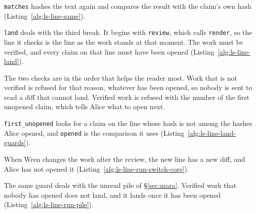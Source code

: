 
\texttt{matches} hashes the text again and compares the result with the
claim's own hash (Listing~\ref{alg:ls-line-same}).


\texttt{land} deals with the third break. It begins with \texttt{review},
which calls \texttt{render}, so the line it checks is the line as the work
stands at that moment. The work must be verified, and every claim on that
line must have been opened (Listing~\ref{alg:ls-line-land}).


The two checks are in the order that helps the reader most. Work that is
not verified is refused for that reason, whatever has been opened, so
nobody is sent to read a diff that cannot land. Verified work is refused
with the number of the first unopened claim, which tells Alice what to
open next.

\texttt{first\_unopened} looks for a claim on the line whose hash is not
among the hashes Alice opened, and \texttt{opened} is the comparison it
uses (Listing~\ref{alg:ls-line-land-guards}).


When Wren changes the work after the review, the new line has a new diff,
and Alice has not opened it (Listing~\ref{alg:ls-line-run-switch-core}).


The same guard deals with the unread pile of \S\ref{sec:mara}. Verified
work that nobody has opened does not land, and it lands once it has been
opened (Listing~\ref{alg:ls-line-run-pile}).


